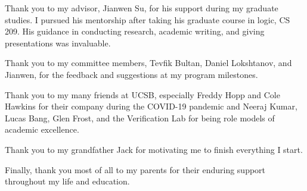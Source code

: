 \begin{acknowledgements}

Thank you to my advisor, Jianwen Su, for his support during my graduate studies.
I pursued his mentorship
after taking his graduate course in logic, CS 209.
His guidance in conducting research, academic writing, and giving presentations
was invaluable.

\medskip

Thank you to my committee members, Tevfik Bultan, Daniel Lokshtanov, and Jianwen,
for the feedback and suggestions at my program milestones.

\medskip

Thank you to my many friends at UCSB,
especially Freddy Hopp and Cole Hawkins for their company during the COVID-19 pandemic
and
Neeraj Kumar, Lucas Bang, Glen Frost, and the Verification Lab
for being role models of academic excellence.

\medskip

Thank you to my grandfather Jack for motivating me to finish everything I start.

\medskip

Finally, thank you most of all to my parents for their enduring support throughout my life and education.

\end{acknowledgements} 